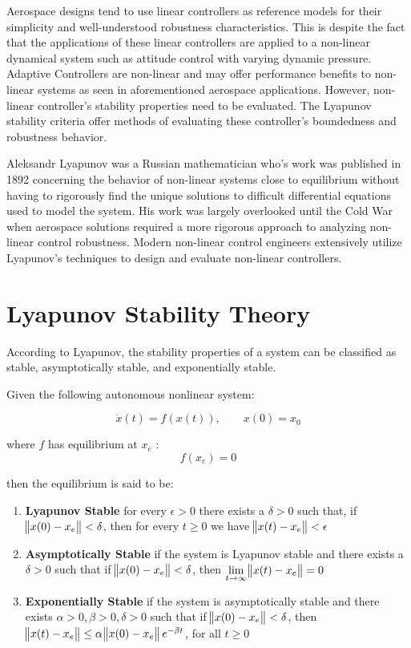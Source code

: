 \label{appendix:lyapunov}

Aerospace designs tend to use linear controllers as reference models for their simplicity and well-understood robustness characteristics.  This is despite the fact that the applications of these linear controllers are applied to a non-linear dynamical system such as attitude control with varying dynamic pressure.  Adaptive Controllers are non-linear and may offer performance benefits to non-linear systems as seen in aforementioned aerospace applications.  However, non-linear controller's stability properties need to be evaluated.  The Lyapunov stability criteria offer methods of evaluating these controller's boundedness and robustness behavior.

Aleksandr Lyapunov was a Russian mathematician who's work was published in 1892 \cite{lyapunov1892general} concerning the behavior of non-linear systems close to equilibrium without having to rigorously find the unique solutions to difficult differential equations used to model the system.  His work was largely overlooked until the Cold War when aerospace solutions required a more rigorous approach to analyzing non-linear control robustness.  Modern non-linear control engineers extensively utilize Lyapunov's techniques to design and evaluate non-linear controllers.

\section{Lyapunov Stability Theory}

According to Lyapunov, the stability properties of a system can be classified as stable, asymptotically stable, and exponentially stable.

Given the following autonomous nonlinear system:

 \begin{equation}
\dot{x}(t)=f(x(t)), \qquad x(0)=x_0
\end{equation}

where $f$ has equilibrium at $x_e$ :
 \begin{equation}
f(x_e) = 0
\end{equation}

then the equilibrium is said to be:
\begin{enumerate}
 \item \textbf{Lyapunov Stable} \newline
 for every $\epsilon > 0$ there exists a $\delta > 0$ such that, if \: $\norm{x(0) - x_e} < \delta$, then for every $t \geq 0$ we have  $ \norm{x(t) - x_e} < \epsilon$ 
 \item \textbf{Asymptotically Stable} \newline
 if the system is Lyapunov stable and there exists a $\delta > 0$ such that if \: $\norm{x(0) - x_e}  < \delta$, then $\displaystyle \lim_{t\to \infty} \norm{x(t)-x_e} =0$
 \item \textbf{Exponentially Stable} \newline
 if the system is asymptotically stable and there exists $\alpha > 0, \beta > 0, \delta > 0$ such that if $\norm{x(0)-x_e}<\delta$, then \:$\norm{x(t)-x_e} \leq \alpha \norm{x(0)-x_e} e^{-\beta t}$, for all $t \geq 0$
\end{enumerate}

